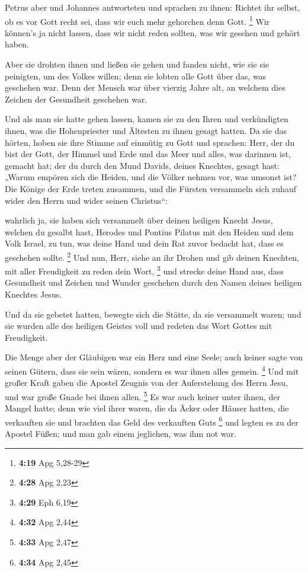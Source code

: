  Petrus aber und Johannes antworteten und sprachen zu
ihnen: Richtet ihr selbst, ob es vor Gott recht sei, dass wir euch mehr
gehorchen denn Gott. \footnote{\textbf{4:19} Apg 5,28-29} 
Wir können's ja nicht lassen, dass wir nicht reden sollten, was wir
gesehen und gehört haben.

 Aber sie drohten ihnen und ließen sie gehen und fanden
nicht, wie sie sie peinigten, um des Volkes willen; denn sie lobten alle
Gott über das, was geschehen war.  Denn der Mensch war über
vierzig Jahre alt, an welchem dies Zeichen der Gesundheit geschehen war.

 Und als man sie hatte gehen lassen, kamen sie zu den Ihren
und verkündigten ihnen, was die Hohenpriester und Ältesten zu ihnen
gesagt hatten.  Da sie das hörten, hoben sie ihre Stimme
auf einmütig zu Gott und sprachen: Herr, der du bist der Gott, der
Himmel und Erde und das Meer und alles, was darinnen ist, gemacht hat;
 der du durch den Mund Davids, deines Knechtes, gesagt
hast: „Warum empören sich die Heiden, und die Völker nehmen vor, was
umsonst ist?  Die Könige der Erde treten zusammen, und die
Fürsten versammeln sich zuhauf wider den Herrn und wider seinen
Christus``:

 wahrlich ja, sie haben sich versammelt über deinen
heiligen Knecht Jesus, welchen du gesalbt hast, Herodes und Pontius
Pilatus mit den Heiden und dem Volk Israel,  zu tun, was
deine Hand und dein Rat zuvor bedacht hat, dass es geschehen sollte.
\footnote{\textbf{4:28} Apg 2,23}  Und nun, Herr, siehe an
ihr Drohen und gib deinen Knechten, mit aller Freudigkeit zu reden dein
Wort, \footnote{\textbf{4:29} Eph 6,19}  und strecke deine
Hand aus, dass Gesundheit und Zeichen und Wunder geschehen durch den
Namen deines heiligen Knechtes Jesus.

 Und da sie gebetet hatten, bewegte sich die Stätte, da sie
versammelt waren; und sie wurden alle des heiligen Geistes voll und
redeten das Wort Gottes mit Freudigkeit.

 Die Menge aber der Gläubigen war ein Herz und eine Seele;
auch keiner sagte von seinen Gütern, dass sie sein wären, sondern es war
ihnen alles gemein. \footnote{\textbf{4:32} Apg 2,44}  Und
mit großer Kraft gaben die Apostel Zeugnis von der Auferstehung des
Herrn Jesu, und war große Gnade bei ihnen allen. \footnote{\textbf{4:33}
  Apg 2,47}  Es war auch keiner unter ihnen, der Mangel
hatte; denn wie viel ihrer waren, die da Äcker oder Häuser hatten, die
verkauften sie und brachten das Geld des verkauften Guts \footnote{\textbf{4:34}
  Apg 2,45}  und legten es zu der Apostel Füßen; und man
gab einem jeglichen, was ihm not war.

